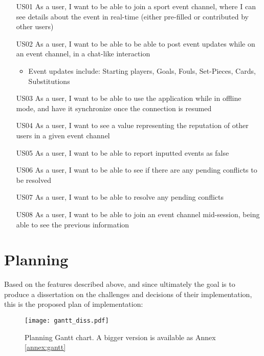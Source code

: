 \begin{itemize}[leftmargin  = 3.25\parindent, align=left]
    \item[US01] As a user, I want to be able to join a sport event channel, where I can see details about the event in real-time (either pre-filled or contributed by other users)
    \item[US02] As a user, I want to be able to be able to post event updates while on an event channel, in a chat-like interaction
    \begin{itemize}
        \item Event updates include: Starting players, Goals, Fouls, Set-Pieces, Cards, Substitutions
    \end{itemize} 
    \item[US03] As a user, I want to be able to use the application while in offline mode, and have it synchronize once the connection is resumed
    \item[US04] As a user, I want to see a value representing the reputation of other users in a given event channel
    \item[US05] As a user, I want to be able to report inputted events as false
    \item[US06] As a user, I want to be able to see if there are any pending conflicts to be resolved
    \item[US07] As a user, I want to be able to resolve any pending conflicts
    \item[US08] As a user, I want to be able to join an event channel mid-session, being able to see the previous information
\end{itemize}

\section{Planning}\label{sec:prob-planning}

Based on the features described above, and since ultimately the goal is to produce a dissertation on the challenges and decisions of their implementation, this is the proposed plan of implementation:

\begin{figure}[ht]
    \begin{center}
        \leavevmode
        \texttt{[image: gantt\_diss.pdf]}
        \caption{Planning Gantt chart. A bigger version is available as Annex \ref{annex:gantt}}
        \label{fig:gantt-plan}
    \end{center}
\end{figure}


